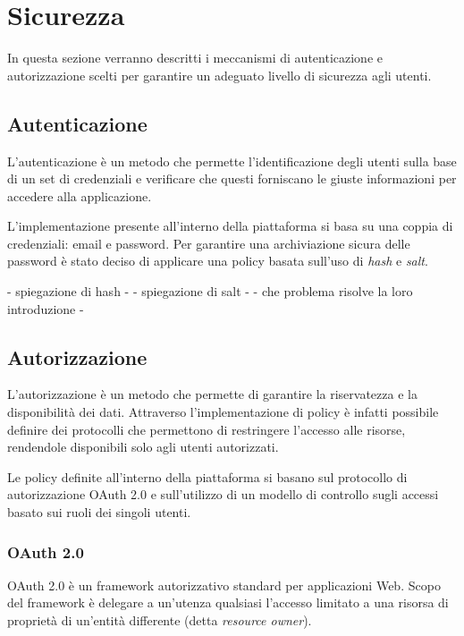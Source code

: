 \section{Sicurezza}
In questa sezione verranno descritti i meccanismi di autenticazione e autorizzazione scelti per
garantire un adeguato livello di sicurezza agli utenti.

\subsection{Autenticazione}
L'autenticazione è un metodo che permette l'identificazione degli utenti sulla base di un set di credenziali e
verificare che questi forniscano le giuste informazioni per accedere alla applicazione.

L'implementazione presente all'interno della piattaforma si basa su una coppia di credenziali: email e password.
Per garantire una archiviazione sicura delle password è stato deciso di applicare una policy basata sull'uso di \textit{hash} e \textit{salt}.


- spiegazione di hash -
- spiegazione di salt -
- che problema risolve la loro introduzione -


\subsection{Autorizzazione}
L'autorizzazione è un metodo che permette di garantire la riservatezza e la disponibilità dei dati.
Attraverso l'implementazione di policy è infatti possibile definire dei protocolli che permettono di restringere l'accesso alle risorse,
rendendole disponibili solo agli utenti autorizzati.

Le policy definite all'interno della piattaforma si basano sul protocollo di autorizzazione OAuth 2.0 \cite{rfc6749} e sull'utilizzo di un
modello di controllo sugli accessi basato sui ruoli dei singoli utenti.


\subsubsection{OAuth 2.0}
OAuth 2.0 \cite{rfc6749} è un framework autorizzativo standard per applicazioni Web.
Scopo del framework è delegare a un'utenza qualsiasi l'accesso limitato a una risorsa di proprietà di un'entità differente (detta \textit{resource owner}).

